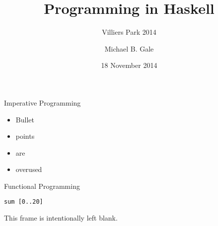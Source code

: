 \documentclass[aspectratio=43]{beamer}
\title{Programming in Haskell}
\subtitle{Villiers Park 2014}
\date{18 November 2014}
\author{Michael B. Gale}
\institute{Computer Laboratory, University of Cambridge}
\begin{document}
\begin{frame}
\maketitle
\end{frame}

\begin{frame}{Imperative Programming}
\begin{itemize}
\item Bullet
\item points
\item are
\item overused
\end{itemize}
\end{frame}

\begin{frame}[fragile]{Functional Programming}
\begin{verbatim}
sum [0..20]
\end{verbatim}
\end{frame}

\begin{frame}
\begin{center}
This frame is intentionally left blank.
\end{center}
\end{frame}
\end{document}
